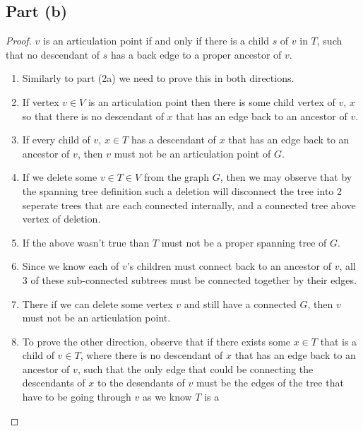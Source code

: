 \documentclass{article}
\begin{document}
\subsection{Part (b)}
\begin{proof} \(v\) is an articulation point if and only if there is a child \(s\) of
      \(v\) in \(T\), such that no descendant of \(s\) has a back edge to a proper ancestor of \(v\).
      \begin{enumerate}
            \item Similarly to part (2a) we need to prove this in both directions.
            \item If vertex \(v \in V\) is an articulation point then there is some child
                  vertex of \(v\), \(x\) so that there is no descendant of \(x\) that has an
                  edge back to an ancestor of \(v\).
            \item If every child of \(v\), \(x \in T\) has a descendant of \(x\) that has
                  an edge back to an ancestor of \(v\), then \(v\) must not be an articulation
                  point of \(G\).
            \item If we delete some \(v \in T \in V\) from the graph \(G\), then we may
                  observe that by the spanning tree definition such a deletion will disconnect
                  the tree into 2 seperate trees that are each connected internally, and a
                  connected tree above vertex of deletion.
            \item If the above wasn't true than \(T\) must not be a proper spanning tree
                  of \(G\).
            \item Since we know each of \(v\)'s children must connect back to an ancestor
                  of \(v\), all 3 of these sub-connected subtrees must be connected together by
                  their edges.
            \item There if we can delete some vertex \(v\) and still have a connected
                  \(G\), then \(v\) must not be an articulation point.
            \item To prove the other direction, observe that if there exists some \(x \in
                  T\) that is a child of \(v \in T\), where there is no descendant of \(x\) that
                  has an edge back to an ancestor of \(v\), such that the only edge that could
                  be connecting the descendants of \(x\) to the desendants of \(v\) must be the
                  edges of the tree that have to be going through \(v\) as we know \(T\) is a

\end{enumerate}
\end{proof}
\end{document}
